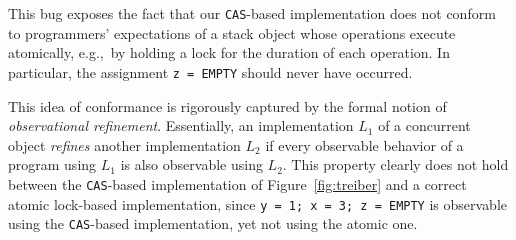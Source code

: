 This bug exposes the fact that our {\tt CAS}-based implementation does not
conform to programmers' expectations of a stack object whose operations
execute atomically, e.g.,~by holding a lock for the duration of each operation.
In particular, the assignment {\tt z = EMPTY} should never have occurred.

This idea of conformance is rigorously captured by the formal notion of
\emph{observational refinement}. Essentially, an implementation $L_1$ of a
concurrent object \emph{refines} another implementation $L_2$ if every
observable behavior of a program using $L_1$ is also observable using $L_2$.
This property clearly does not hold between the {\tt CAS}-based implementation
of Figure~\ref{fig:treiber} and a correct atomic lock-based implementation,
since {\tt y = 1; x = 3; z = EMPTY} is observable using the {\tt CAS}-based
implementation, yet not using the atomic one.
